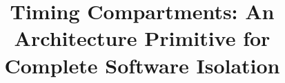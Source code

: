 \documentclass[pageno]{jpaper}
\begin{document}
\title{
    Timing Compartments: An Architecture Primitive for Complete Software 
    Isolation
}
\author{
}
\date{}
\maketitle










\end{document}

